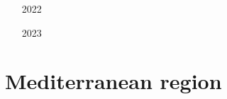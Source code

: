 \begin{small}
\begin{itemize}
\item[2022]
\item[2023]
\end{itemize}
\end{small}




\section{Mediterranean region}

